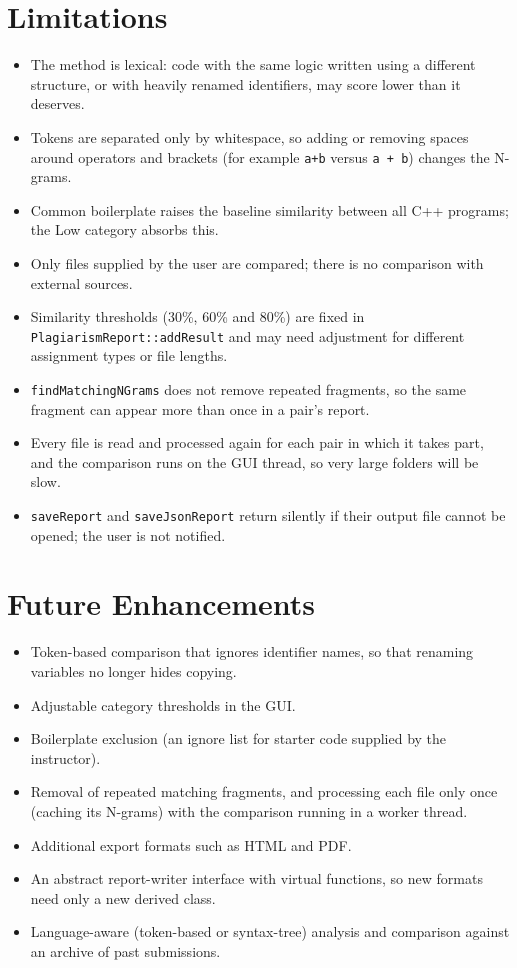 \documentclass[11pt,a4paper]{report}
\newcommand{\cc}[1]{\texttt{#1}}
\begin{document}
\section{Limitations}
\begin{itemize}[nosep]
  \item The method is lexical: code with the same logic written using a different structure,
        or with heavily renamed identifiers, may score lower than it deserves.
  \item Tokens are separated only by whitespace, so adding or removing spaces around
        operators and brackets (for example \cc{a+b} versus \cc{a + b}) changes the N-grams.
  \item Common boilerplate raises the baseline similarity between all C++ programs; the Low
        category absorbs this.
  \item Only files supplied by the user are compared; there is no comparison with external
        sources.
  \item Similarity thresholds (30\%, 60\% and 80\%) are fixed in
        \cc{PlagiarismReport::addResult} and may need adjustment for different assignment
        types or file lengths.
  \item \cc{findMatchingNGrams} does not remove repeated fragments, so the same fragment can
        appear more than once in a pair's report.
  \item Every file is read and processed again for each pair in which it takes part, and the
        comparison runs on the GUI thread, so very large folders will be slow.
  \item \cc{saveReport} and \cc{saveJsonReport} return silently if their output file cannot
        be opened; the user is not notified.
\end{itemize}

\section{Future Enhancements}\label{sec:future}
\begin{itemize}[nosep]
  \item Token-based comparison that ignores identifier names, so that renaming variables no
        longer hides copying.
  \item Adjustable category thresholds in the GUI.
  \item Boilerplate exclusion (an ignore list for starter code supplied by the instructor).
  \item Removal of repeated matching fragments, and processing each file only once (caching
        its N-grams) with the comparison running in a worker thread.
  \item Additional export formats such as HTML and PDF.
  \item An abstract report-writer interface with virtual functions, so new formats need only
        a new derived class.
  \item Language-aware (token-based or syntax-tree) analysis and comparison against an
        archive of past submissions.
\end{itemize}
\end{document}
